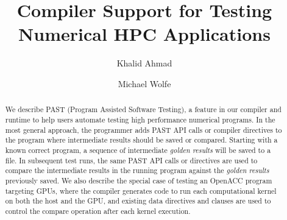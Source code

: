 \documentclass{llncs}
\begin{document}
\title{Compiler Support for Testing Numerical HPC Applications}
%
%
\author{Khalid Ahmad \and Michael Wolfe}
%
%
%

\maketitle              %

\begin{abstract}
We describe PAST (Program Assisted Software Testing), a feature in our compiler and runtime to help users automate testing high performance numerical programs.
In the most general approach, the programmer adds PAST API calls or compiler directives to the program where intermediate results should be saved or compared.
Starting with a known correct program, a sequence of intermediate \emph{golden results} will be saved to a file.
In subsequent test runs, the same PAST API calls or directives are used to compare the intermediate results in the running program against the \emph{golden results} previously saved.
We also describe the special case of testing an OpenACC program targeting GPUs, where the compiler generates code to run each computational kernel on both the host and the GPU, and existing data directives and clauses are used to control the compare operation after each kernel execution.

\end{abstract}
%









%


\end{document}
